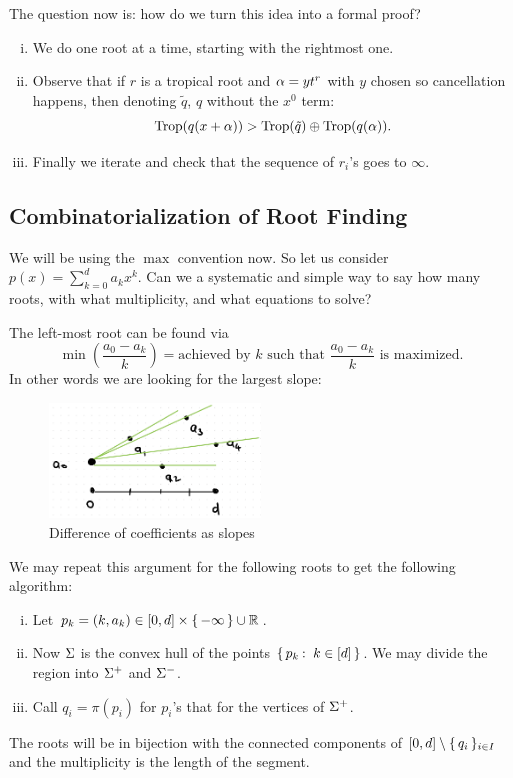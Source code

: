 \documentclass[12pt]{memoir}
\DeclareMathOperator{\Trop}{Trop}
\begin{document}
The question now is: how do we turn this idea into a formal proof?
\begin{enumerate}[i.]
    \item We do one root at a time, starting with the rightmost one.
    \item Observe that if $r$ is a tropical root and $\alpha=yt^r$ with $y$ chosen so cancellation happens, then denoting $\tilde{q}$, $q$ without the $x^0$ term:
    $$\Trop(q(x+\al))>\Trop(\tilde{q})\oplus\Trop(q(\al)).$$
    \item Finally we iterate and check that the sequence of $r_i$'s goes to $\infty$.
\end{enumerate}

\subsection{Combinatorialization of Root Finding}

We will be using the $\max$ convention now. So let us consider $p(x)=\sum_{k=0}^da_kx^k$. Can we a systematic and simple way to say how many roots, with what multiplicity, and what equations to solve?\par 
The left-most root can be found via
$$\min\left(\frac{a_0-a_k}{k}\right)=\text{achieved by }k\text{ such that }\frac{a_0-a_k}{k}\text{ is maximized}.$$
In other words we are looking for the largest slope:
\begin{figure}[h!]
    \centering
    \includegraphics[width=0.5\textwidth]{figs/fig6-1BiggestSlope.png}
    \caption{Difference of coefficients as slopes}
    \label{fig:6.1-BiggestSlope}
\end{figure}
We may repeat this argument for the following roots to get the following algorithm:
\begin{enumerate}[i.]
    \item Let $p_k=(k,a_k)\in\left\lbrack0,d\right\rbrack\times\{\,-\infty\,\}\cup\mathbb{R}$.
    \item Now $\Sigma$ is the convex hull of the points $\{\,p_k\mathbin{:}\ k\in[d]\,\}$. We may divide the region into $\Sigma^+$ and $\Sigma^-$.
    \item Call $q_i=\pi(p_i)$ for $p_i$'s that for the vertices of $\Sigma^+$.
\end{enumerate}
The roots will be in bijection with the connected components of $\left\lbrack0,d\right\rbrack\setminus\{\,q_i\,\}_{i\in I}$ and the multiplicity is the length of the segment.
\end{document}

